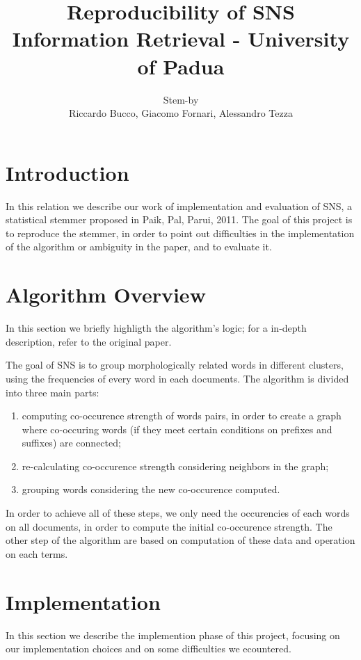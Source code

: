 \documentclass[10pt,a4paper]{article}
\author{Stem-by\\Riccardo Bucco, Giacomo Fornari, Alessandro Tezza}
\title{Reproducibility of SNS \\Information Retrieval - University of Padua}
\begin{document}
\maketitle

\section{Introduction}
In this relation we describe our work of implementation and evaluation of SNS, a statistical stemmer proposed in Paik, Pal, Parui, 2011.
The goal of this project is to reproduce the stemmer, in order to point out difficulties in the implementation of the algorithm or ambiguity in the paper, and to evaluate it.

\section{Algorithm Overview}
In this section we briefly highligth the algorithm's logic; for a in-depth description, refer to the original paper.
 
The goal of SNS is to group morphologically related words in different clusters, using the frequencies of every word in each documents. The algorithm is divided into three main parts:

\begin{enumerate}
\item computing co-occurence strength of words pairs, in order to create a graph where co-occuring words (if they meet certain conditions on prefixes and suffixes) are connected;
\item re-calculating co-occurence strength considering neighbors in the graph;
\item grouping words considering the new co-occurence computed.
\end{enumerate}

In order to achieve all of these steps, we only need the occurencies of each words on all documents, in order to compute the initial co-occurence strength. The other step of the algorithm are based on computation of these data and operation on each terms.  


\section{Implementation}
In this section we describe the implemention phase of this project, focusing on our implementation choices and on some difficulties we ecountered.
\end{document}
